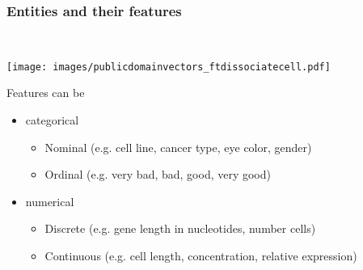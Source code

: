 \documentclass[aspectratio=169]{beamer}
\begin{document}
\begin{frame}
  \frametitle{Entities and their features}    
  \begin{block}{}
    \vspace{0.5cm}
    \ \ \ \
    \begin{minipage}{0.10\textwidth}
      \begin{center}
        \texttt{[image: images/publicdomainvectors\_ftdissociatecell.pdf]}
      \end{center}        
    \end{minipage}
    \hfill
    \begin{minipage}{0.80\textwidth}

      Features can be\\
      \begin{itemize}
        \item categorical
          \begin{itemize}
          \item Nominal (e.g. cell line, cancer type, eye color, gender)
          \item Ordinal (e.g. very bad, bad, good, very good)
          \end{itemize}
        \item numerical
          \begin{itemize}
          \item Discrete (e.g. gene length in nucleotides, number cells)
          \item Continuous (e.g. cell length, concentration, relative expression) 
          \end{itemize}
      \end{itemize}
      
    \end{minipage}
    \vspace{0.3cm}
  \end{block}
\end{frame}

\end{document}
